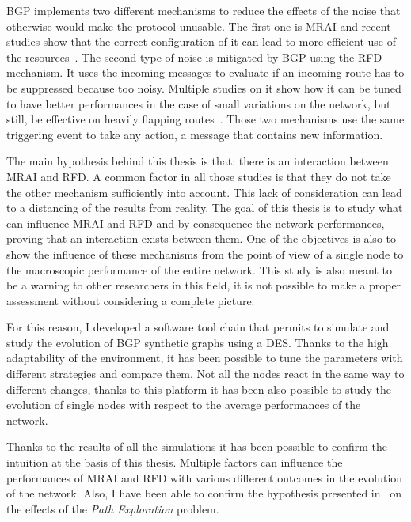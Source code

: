 \ac{BGP} implements two different mechanisms to reduce the effects of the
noise that otherwise would make the protocol unusable.
The first one is \ac{MRAI} and recent studies show that the correct
configuration of it can lead to more efficient use of the
resources~\cite{griffin2001experimental,fabrikant2011there,deshpande2004impact,milani2020improving}.
The second type of noise is mitigated by \ac{BGP} using the \ac{RFD} mechanism.
It uses the incoming messages to evaluate if an incoming route has
to be suppressed because too noisy.
Multiple studies on it show how it can be tuned to have better performances in
the case of small variations on the network, but still, be effective on heavily
flapping routes~\cite{mao2002route,gray2020bgp,rfc7196}.
Those two mechanisms use the same triggering event to take any action,
a message that contains new information.

The main hypothesis behind this thesis is that: there is an interaction
between \ac{MRAI} and \ac{RFD}.
A common factor in all those studies is that they do not take the other
mechanism sufficiently into account.
This lack of consideration can lead to a distancing of the results from
reality.
The goal of this thesis is to study what can influence \ac{MRAI} and \ac{RFD}
and by consequence the network performances, proving that an interaction
exists between them.
One of the objectives is also to show the influence of these mechanisms from
the point of view of a single node to the macroscopic performance of the
entire network.
This study is also meant to be a warning to other researchers in this field, it
is not possible to make a proper assessment without considering a complete picture.

For this reason, I developed a software tool chain that permits to simulate and
study the evolution of \ac{BGP} synthetic graphs using a \ac{DES}.
Thanks to the high adaptability of the environment, it has been possible to tune
the parameters with different strategies and compare them.
Not all the nodes react in the same way to different changes, thanks to this
platform it has been also possible to study the evolution of single nodes
with respect to the average performances of the network.

Thanks to the results of all the simulations it has been possible to confirm
the intuition at the basis of this thesis.
Multiple factors can influence the performances of \ac{MRAI} and \ac{RFD} with
various different outcomes in the evolution of the network.
Also, I have been able to confirm the hypothesis presented in~\cite{griffinFSM,fabrikant2011there}
on the effects of the \textit{Path Exploration} problem.


